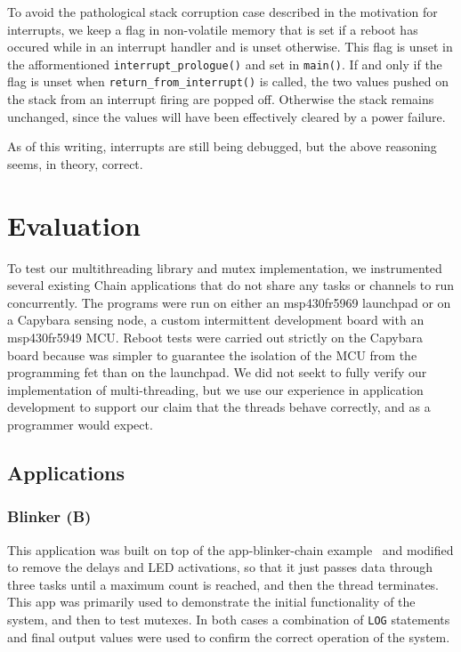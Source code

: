 \documentclass[11pt]{sensys-proc}
\begin{document}
To avoid the pathological stack corruption case described in the motivation for
interrupts, we keep a flag in non-volatile memory that is set if a reboot has
occured while in an interrupt handler and is unset otherwise. This flag is
unset in the afformentioned \texttt{interrupt\_prologue()} and set in
\texttt{main()}. If and only if the flag is unset when
\texttt{return\_from\_interrupt()} is called, the two values pushed on the
stack from an interrupt firing are popped off. Otherwise the stack remains
unchanged, since the values will have been effectively cleared by a power
failure.


As of this writing, interrupts are still being debugged, but the above
reasoning seems, in theory, correct.


\section{Evaluation}
To test our multithreading library and mutex implementation, we instrumented
several existing Chain applications that do not share any tasks or channels to
run concurrently. The programs were run on either an msp430fr5969 launchpad or
on a Capybara sensing node, a custom intermittent development board with an
msp430fr5949 MCU. Reboot tests were carried out strictly on the Capybara board
because was simpler to guarantee the isolation of the MCU from the programming
fet than on the launchpad. We did not seekt to fully verify our implementation
of multi-threading, but we use our experience in application development to
support our claim that the threads behave correctly, and as a programmer would
expect.

\subsection{Applications}
\subsubsection{Blinker (B)}
This application was built on top of the app-blinker-chain
example~\cite{blinker} and modified to remove the delays and LED activations, so
that it just passes data through three tasks until a maximum count is reached,
and then the thread terminates. This app was primarily used to demonstrate the
initial functionality of the system, and then to test mutexes. In both cases a
combination of \texttt{LOG} statements and final output values were used to
confirm the correct operation of the system.
\end{document}
